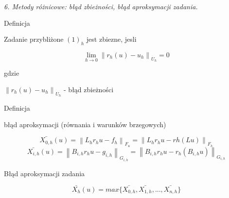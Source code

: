 \textit{6. Metody różnicowe: błąd zbieżności, błąd aproksymacji zadania.}

Definicja

Zadanie przybliżone $(1)_h$ jest zbiezne, jesli

\[ \lim_{h \rightarrow 0} \left \| r_h(u) - u_h \right \|_{U_h} = 0 \]

gdzie

$\left \| r_h(u) - u_h \right \|_{U_h}$ - błąd zbieżności

Definicja

błąd aproksymacji (równania i warunków brzegowych)

\[ \bar{X_{0,h}} (u) = \left \| L_h r_h u - f_h \right \| _{F_u} = \left \| L_hr_hu - rh(Lu) \right \| _{F_h} \]
\[ \bar{X_{i,h}} (u) = \left \| B_{i,h} r_h u - g_{i,h} \right \|_{G_{i,h}} = \left \| B_{i,h} r_h u - r_h (B_{i,h} u) \right \| _{G_{i,h}} \]

Błąd aproksymacji zadania

\[ \bar{X_h} (u) = max \{ \bar{X_{0,h}}, \bar{X_{1,h}}, ..., \bar{X_{n,h}} \} \]

